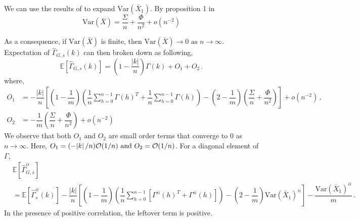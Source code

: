 \documentclass[11pt]{article}
\newcommand{\E}{\mathbb{E}}
\newcommand{\Var}{\text{Var}}
\theoremstyle{remark}
\begin{document}
 We can use the results of \cite{song1995optimal} to expand $\Var(\bar{X}_1)$. By proposition 1 in \cite{song1995optimal} 
\[
\Var(\bar{X}) = \dfrac{\Sigma}{n} + \dfrac{\Phi}{n^2} + o(n^{-2})
\]

As a consequence, if $\Var(\bar{X})$ is finite, then $\Var(\bar{X}) \to 0 \textrm{ as } n \to \infty$. Expectation of $\hat{\Gamma}_{G,s}(k)$ can then broken down as following,
 \begin{equation} \label{eq:G-ACF_expec_breakdown}
     \mathbb{E}\left[\hat{\Gamma}_{G,s}(k)\right] = \left(1- \dfrac{|k|}{n}\right)\Gamma(k) + O_1 + O_2\,.
 \end{equation}
%
where,
\begin{align*}
    O_1 &= -\dfrac{|k|}{n}\left[\left(1-\dfrac{1}{m}\right)\left(\dfrac{1}{n}\sum_{h=0}^{n-1}\Gamma(h)^T + \dfrac{1}{n}\sum_{h=0}^{n-1}\Gamma(h)\right) - \left(2-\dfrac{1}{m}\right) \left(\dfrac{\Sigma}{n} + \dfrac{\Phi}{n^2}\right)\right] + o(n^{-2})\, ,\\
    O_2 &= -\dfrac{1}{m}\left(\dfrac{\Sigma}{n} + \dfrac{\Phi}{n^2}\right) + o(n^{-2})
\end{align*}
%
We observe that both $O_1 \textrm{ and } O_2$ are small order terms that converge to 0 as $n \to \infty$. Here, $O_1 = (-\abs{k}/n)\mathcal{O}(1/n) \textrm{ and } O_2 = {\mathcal{O}}(1/n)$. For a diagonal element of $\Gamma$,
%
\begin{align*}
& \E \left[ \hat{\Gamma}_{G,s}^{ii}\right]\\
& = \mathbb{E}\left[\hat{\Gamma}^{ii}_{s}(k)\right] - \dfrac{|k|}{n}\left[\left(1-\dfrac{1}{m}\right)\left(\dfrac{1}{n}\sum_{h=0}^{n-1} \left[\Gamma^{ii}(h)^T + \Gamma^{ii}(h) \right] \right) - \left(2-\dfrac{1}{m}\right) \Var(\bar{X}_1)^{ii}\right] - \dfrac{\Var(\bar{X}_1)^{ii}}{m}\,.
\end{align*}
In the presence of positive correlation, the leftover term is positive.


\end{document}
